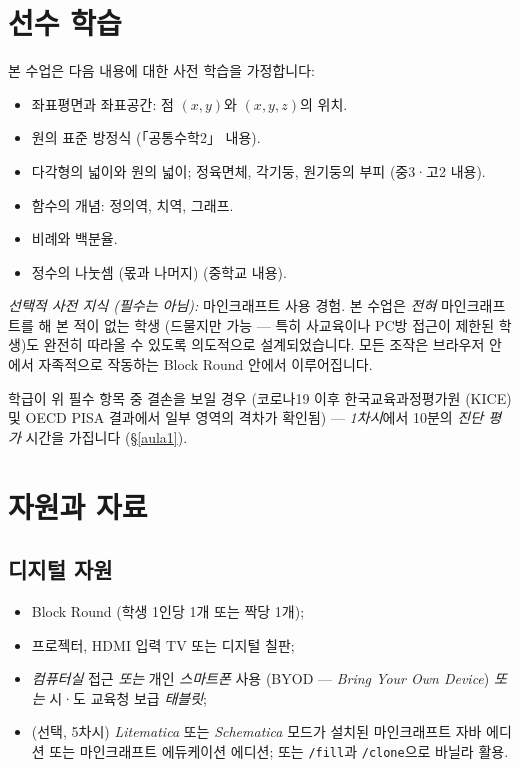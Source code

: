 \documentclass[12pt,a4paper]{scrartcl}
\newcommand{\cmd}[1]{\textcolor{earth}{\texttt{\small #1}}}
\begin{document}
\section{선수 학습}\label{sec:prerrequisitos}

본 수업은 다음 내용에 대한 사전 학습을 가정합니다:

\begin{itemize}[leftmargin=1.3em,itemsep=0.15em,topsep=0.3em]
  \item 좌표평면과 좌표공간: 점 $(x, y)$와 $(x, y, z)$의 위치.
  \item 원의 표준 방정식 (「공통수학2」 내용).
  \item 다각형의 넓이와 원의 넓이; 정육면체, 각기둥, 원기둥의 부피 (중3·고2 내용).
  \item 함수의 개념: 정의역, 치역, 그래프.
  \item 비례와 백분율.
  \item 정수의 나눗셈 (몫과 나머지) (중학교 내용).
\end{itemize}

\emph{선택적 사전 지식 (필수는 아님):} 마인크래프트 사용 경험. 본 수업은 \emph{전혀} 마인크래프트를 해 본 적이 없는 학생 (드물지만 가능 --- 특히 사교육이나 PC방 접근이 제한된 학생)도 완전히 따라올 수 있도록 의도적으로 설계되었습니다. 모든 조작은 브라우저 안에서 자족적으로 작동하는 Block Round 안에서 이루어집니다.

학급이 위 필수 항목 중 결손을 보일 경우 (코로나19 이후 한국교육과정평가원 (KICE) 및 OECD PISA 결과에서 일부 영역의 격차가 확인됨) --- \emph{1차시}에서 10분의 \emph{진단 평가} 시간을 가집니다 (§\ref{aula1}).

\section{자원과 자료}\label{sec:recursos}

\subsection{디지털 자원}
\begin{itemize}[leftmargin=1.3em,itemsep=0.15em,topsep=0.3em]
  \item Block Round (학생 1인당 1개 또는 짝당 1개);
  \item 프로젝터, HDMI 입력 TV 또는 디지털 칠판;
  \item \emph{컴퓨터실} 접근 \emph{또는} 개인 \emph{스마트폰} 사용 (BYOD --- \emph{Bring Your Own Device}) \emph{또는} 시·도 교육청 보급 \emph{태블릿};
  \item (선택, 5차시) \emph{Litematica} 또는 \emph{Schematica} 모드가 설치된 마인크래프트 자바 에디션 또는 마인크래프트 에듀케이션 에디션; 또는 \cmd{/fill}과 \cmd{/clone}으로 바닐라 활용.
\end{itemize}
\end{document}
